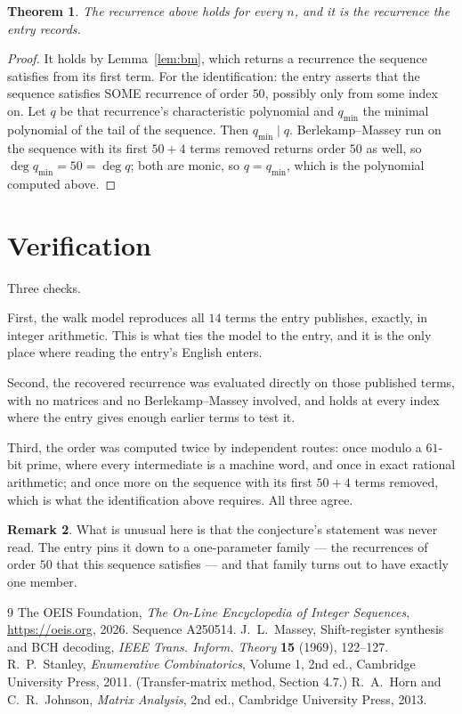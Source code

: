 \documentclass[11pt,a4paper]{article}
\theoremstyle{plain}
\newtheorem{theorem}{Theorem}
\theoremstyle{definition}
\newtheorem{remark}[theorem]{Remark}
\begin{document}
\begin{theorem}
The recurrence above holds for every $n$, and it is the recurrence the entry records.
\end{theorem}

\begin{proof}
It holds by Lemma~\ref{lem:bm}, which returns a recurrence the sequence satisfies from its
first term. For the identification: the entry asserts that the sequence satisfies SOME
recurrence of order $50$, possibly only from some index on. Let $q$ be that recurrence's
characteristic polynomial and $q_{\min}$ the minimal polynomial of the tail of the sequence.
Then $q_{\min}\mid q$. Berlekamp--Massey run on the sequence with its first $50+4$ terms
removed returns order $50$ as well, so $\deg q_{\min}=50=\deg q$; both are monic, so
$q=q_{\min}$, which is the polynomial computed above.
\end{proof}

\section{Verification}

Three checks.

First, the walk model reproduces all $14$ terms the entry publishes, exactly, in integer
arithmetic. This is what ties the model to the entry, and it is the only place where reading
the entry's English enters.

Second, the recovered recurrence was evaluated directly on those published terms, with no
matrices and no Berlekamp--Massey involved, and holds at every index where the entry gives
enough earlier terms to test it.

Third, the order was computed twice by independent routes: once modulo a $61$-bit prime, where
every intermediate is a machine word, and once in exact rational arithmetic; and once more on
the sequence with its first $50+4$ terms removed, which is what the identification above
requires. All three agree.

\begin{remark}
What is unusual here is that the conjecture's statement was never read. The entry pins it down
to a one-parameter family --- the recurrences of order $50$ that this sequence satisfies
--- and that family turns out to have exactly one member.
\end{remark}

\begin{thebibliography}{9}
 The OEIS Foundation, \emph{The On-Line Encyclopedia of Integer
Sequences}, \url{https://oeis.org}, 2026. Sequence A250514.
 J.~L.~Massey, Shift-register synthesis and BCH decoding, \emph{IEEE
Trans. Inform. Theory} \textbf{15} (1969), 122--127.
 R.~P.~Stanley, \emph{Enumerative Combinatorics}, Volume 1, 2nd ed.,
Cambridge University Press, 2011. (Transfer-matrix method, Section 4.7.)
 R.~A.~Horn and C.~R.~Johnson, \emph{Matrix Analysis}, 2nd ed., Cambridge
University Press, 2013.
\end{thebibliography}
\end{document}
